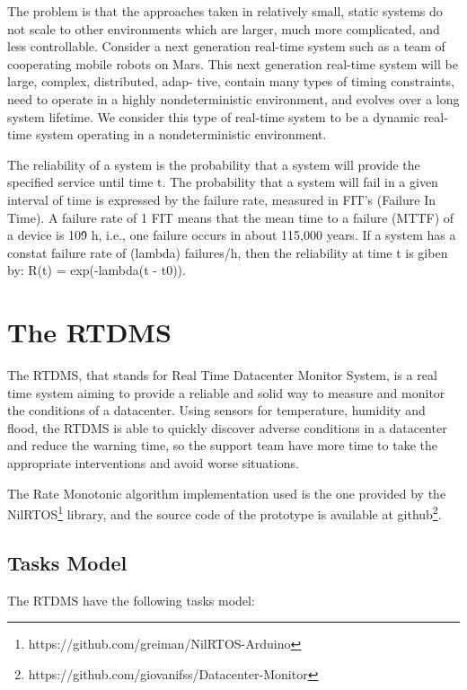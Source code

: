 \documentclass[12pt]{article}
\begin{document}
The problem is that the approaches taken in relatively small, static systems do not scale
to other environments which are larger, much more complicated, and less controllable.
Consider a next generation real-time system such as a team of cooperating mobile robots
on Mars. This next generation real-time system will be large, complex, distributed, adap-
tive, contain many types of timing constraints, need to operate in a highly nondeterministic
environment, and evolves over a long system lifetime. We consider this type of real-time system to be
a dynamic real-time system operating in a nondeterministic environment. \cite{stankovic1990predictability}

The reliability of a system is the probability that a system will provide the specified service until time t.
The probability that a system will fail in a given interval of time is expressed by the failure rate, 
measured in FIT's (Failure In Time). A failure rate of 1 FIT means that the mean time to a failure (MTTF) 
of a device is 10\^9 h, i.e., one failure occurs in about 115,000 years.
If a system has a constat failure rate of (lambda) failures/h, then the reliability at time t is giben by:
R(t) = exp(-lambda(t - t0)). \cite{kopetz2011real}

\fi

\section{The RTDMS}

The RTDMS, that stands for Real Time Datacenter Monitor System, is a real time system aiming
to provide a reliable and solid way to measure and monitor the conditions of a datacenter. Using
sensors for temperature, humidity and flood, the RTDMS is able to quickly discover adverse conditions
in a datacenter and reduce the warning time, so the support team have more time to take the
appropriate interventions and avoid worse situations.

The Rate Monotonic algorithm implementation used is the one provided by the NilRTOS\footnote{https://github.com/greiman/NilRTOS-Arduino} 
library, and the source code of the prototype is available at github\footnote{https://github.com/giovanifss/Datacenter-Monitor}.

\subsection{Tasks Model}
The RTDMS have the following tasks model:
\end{document}
